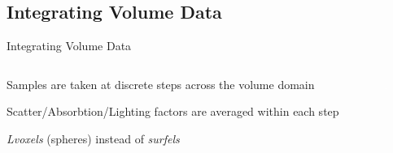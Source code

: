 \documentclass[10pt,compress,professionalfont]{beamer}
\begin{document}
\subsection{Integrating Volume Data}
\begin{frame}{Integrating Volume Data}

    \begin{columns}
        \begin{column}{0.5\textwidth}

    Samples are taken at discrete steps across the volume domain\\
    \vspace{8mm}

    Scatter/Absorbtion/Lighting factors are averaged within each step\\
    \vspace{8mm}

    \textit{Lvoxels} (spheres) instead of \textit{surfels}

        \end{column}
        \begin{column}{0.5\textwidth}
            \includegraphics[width=\textwidth]{../img/diag/vol_step.pdf}\\
            \vspace{-4mm}
        \end{column}
    \end{columns}

\end{frame}
\end{document}
